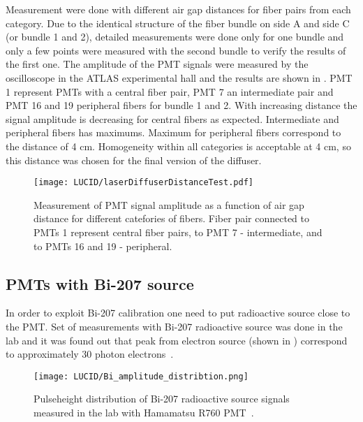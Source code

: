 Measurement were done with different air gap distances for fiber pairs from each category. 
Due to the identical structure of the fiber bundle on side A and side C (or bundle 1 and 2), detailed measurements
were done only for one bundle and only a few points were measured with the second bundle to verify the results of the first one. 
The amplitude of the PMT signals were measured by the oscilloscope in the ATLAS experimental hall
and the results are shown in . 
PMT 1 represent PMTs with a central fiber pair, PMT 7 an intermediate pair and PMT 16 and 19 peripheral fibers for bundle 1 and 2. 
With increasing distance the signal amplitude is decreasing for central fibers as expected. 
Intermediate and peripheral fibers has maximums. Maximum for peripheral fibers correspond to the distance of 4 cm.
Homogeneity within all categories is acceptable at 4 cm, so this distance was chosen for the final version of the diffuser.



\begin{figure}
\centering
\texttt{[image: LUCID/laserDiffuserDistanceTest.pdf]}
\caption{Measurement of PMT signal amplitude as a function of air gap distance for different catefories of fibers. Fiber pair connected to PMTs 1 represent 
central fiber pairs, to PMT 7 - intermediate, and to PMTs 16 and 19 - peripheral.}
\label{fig:laserDiffuserDistanceTest}
\end{figure}


\subsection{PMTs with Bi-207 source}
\label{subsec:bi207Calibration}

In order to exploit Bi-207 calibration one need to put radioactive source close to the PMT.
Set of measurements with Bi-207 radioactive source was done in the lab and it was found out that peak from electron source 
(shown in ) correspond to approximately 30 photon electrons~\cite{Alberghi:2016tad}.

\begin{figure}
\centering
\texttt{[image: LUCID/Bi\_amplitude\_distribtion.png]}
\caption{Pulseheight distribution of Bi-207 radioactive source signals measured in the lab with Hamamatsu R760 PMT~\cite{Alberghi:2016tad}.}
\label{fig:pulseheight_Bi207}
\end{figure}


